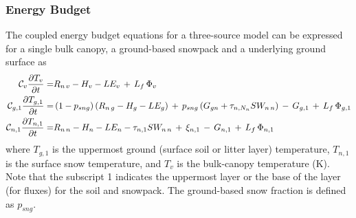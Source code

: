 \subsubsection{Energy Budget}
\label{sec:meb_energy_budget}

The coupled energy budget equations for a three-source model
can be expressed for a single bulk canopy, a ground-based snowpack and a 
underlying ground surface as
%
\begin{align}
\label{eq:meb_cvdtvdt_three}
{\cal C}_v {\frac {\partial T_v}{\partial t}} =& 
R_{n\,v} - H_{v} - LE_{v} 
\,+\, L_f\,\Phi_{v} 
\\
%
\label{eq:meb_cgdtgdt_three}
{\cal C}_{g,1} {\frac {\partial T_{g,1}}{\partial t}} =& 
\left(1-p_{sng}\right) \left( R_{n\,g} - H_{g} - LE_{g}\right)
\,+\, p_{sng}\left(G_{gn} + \tau_{n,N_n}SW_{n\,n}\right)
\,-\, G_{g,1} \,+\, L_f\,\Phi_{g,1} 
\\
%
\label{eq:meb_cndtndt_three}
{\cal C}_{n,1} {\frac {\partial T_{n,1}}{\partial t}} =& 
R_{n\,n} - H_{n} - LE_{n} - \tau_{n,1}SW_{n\,n} 
\,+\, \xi_{n,1} \,-\, G_{n,1} \,+\, L_f\,\Phi_{n,1} 
%
\end{align}
%
where $T_{g,1}$ is the uppermost ground (surface soil or litter layer) temperature,
$T_{n,1}$ is the surface snow temperature, 
and $T_v$ is the bulk-canopy temperature (K). 
%
Note that the subscript 1
indicates the uppermost layer or the base of the layer (for fluxes) 
for the soil and snowpack.
%
The ground-based snow fraction is defined as $p_{sng}$. 
